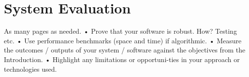 \chapter{System Evaluation}


As many pages as needed.
• Prove that your software is robust. How? Testing etc.
• Use performance benchmarks (space and time) if algorithmic.
• Measure the outcomes / outputs of your system / software against the
objectives from the Introduction.
• Highlight any limitations or opportuni-ties in your approach or technologies
used.